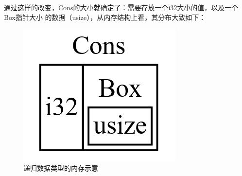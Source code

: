 通过这样的改变，Cons的大小就确定了：需要存放一个i32大小的值，以及一个Box指针大小
的数据（usize），从内存结构上看，其分布大致如下：
\begin{figure}[H]
  \centering
  \includegraphics[scale=0.8]{rust_box.png}
  \caption{递归数据类型的内存示意}
  \label{fig:rust_box}
\end{figure}

